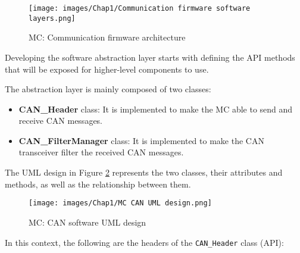 \begin{figure}[H]
\begin{center}
\texttt{[image: images/Chap1/Communication firmware software layers.png]}\\
\caption{MC: Communication firmware architecture}
\label{Communication firmware layers architecture}
\end{center}
\end{figure}

Developing \colorbox{blue!20}{the software abstraction layer} starts with defining the API methods that will be exposed for higher-level components to use.

The abstraction layer is mainly composed of two classes:
\begin{itemize}
    \item \textbf{CAN\_Header} class: It is implemented to make the MC able to send and receive CAN messages.

    \item \textbf{CAN\_FilterManager} class: It is implemented to make the CAN transceiver filter the received CAN messages.
\end{itemize}

The UML design in Figure \ref{MC CAN UML} represents the two classes, their attributes and methods, as well as the relationship between them.

\begin{figure}[H]
\begin{center}
\texttt{[image: images/Chap1/MC CAN UML design.png]}\\
\caption{MC: CAN software UML design}
\label{MC CAN UML}
\end{center}
\end{figure}


In this context, the following are the headers of the \texttt{CAN\_Header} class (API): 

